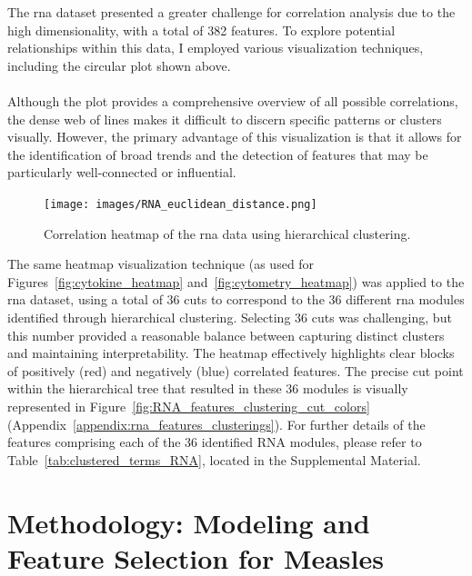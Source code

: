 \documentclass[12pt,a4paper]{report}
\newcommand{\todo}[1]{%
  \par\noindent%
  \begin{tcolorbox}[colback=yellow, colframe=black, boxrule=0.5pt, sharp corners, width=\linewidth, before skip=5pt, after skip=5pt]
    \textbf{TODO:} #1
  \end{tcolorbox}%
  \par
}
\begin{document}
The \acrshort{rna} dataset presented a greater challenge for correlation analysis due to the high dimensionality, with a total of 382 features. To explore potential relationships within this data, I employed various visualization techniques, including the circular plot shown above.\\
\\
 Although the plot provides a comprehensive overview of all possible correlations, the dense web of lines makes it difficult to discern specific patterns or clusters visually. However, the primary advantage of this visualization is that it allows for the identification of broad trends and the detection of features that may be particularly well-connected or influential.

\begin{figure}[H]
  \centering
  \texttt{[image: images/RNA\_euclidean\_distance.png]}
  \caption[\acrshort{rna} data correlations]{Correlation heatmap of the \acrshort{rna} data using hierarchical clustering.}
  \label{fig:RNA_heatmap}
\end{figure}

\noindent
The same heatmap visualization technique (as used for Figures~\ref{fig:cytokine_heatmap} and~\ref{fig:cytometry_heatmap}) was applied to the \acrshort{rna} dataset, using a total of 36 cuts to correspond to the 36 different \acrshort{rna} modules identified through hierarchical clustering. Selecting 36 cuts was challenging, but this number provided a reasonable balance between capturing distinct clusters and maintaining interpretability. The heatmap effectively highlights clear blocks of positively (red) and negatively (blue) correlated features. The precise cut point within the hierarchical tree that resulted in these 36 modules is visually represented in Figure~\ref{fig:RNA_features_clustering_cut_colors} (Appendix~\ref{appendix:rna_features_clusterings}). For further details of the features comprising each of the 36 identified RNA modules, please refer to Table~\ref{tab:clustered_terms_RNA}, located in the Supplemental Material.





\chapter{Methodology: Modeling and Feature Selection for Measles}
\label{chap:methodology}
\end{document}

